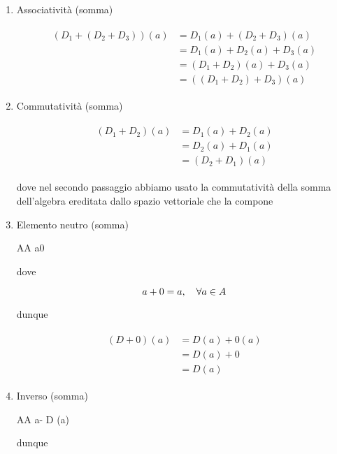 \begin{enumerate}
	\item Associatività (somma)
	
		\begin{align}
			\begin{split}
				( D_{1} + (D_{2} + D_{3}) ) (a) &= D_{1} (a) + (D_{2} + D_{3}) (a)\\
				&= D_{1} (a) + D_{2} (a) + D_{3} (a)\\
				&= (D_{1} + D_{2}) (a) + D_{3} (a)\\
				&= ( (D_{1} + D_{2}) + D_{3} ) (a)
			\end{split}
		\end{align}
	
	\item Commutatività (somma)
	
		\begin{align}
			\begin{split}
				(D_{1} + D_{2}) (a) &= D_{1} (a) + D_{2} (a)\\
				&= D_{2} (a) + D_{1} (a)\\
				&= (D_{2} + D_{1}) (a)
			\end{split}
		\end{align}
		
		dove nel secondo passaggio abbiamo usato la commutatività della somma dell'algebra ereditata dallo spazio vettoriale che la compone
	
	\item Elemento neutro (somma)
	
			{A}{A}
			{a}{0}
		
		dove
		
		\begin{equation}
			a + 0 = a \qcomma \forall a \in A
		\end{equation}
		
		dunque
		
		\begin{align}
			\begin{split}
				(D + 0) (a) &= D (a) + 0 (a)\\
				&= D (a) + 0\\
				&= D (a)
			\end{split}
		\end{align}
	
	\item Inverso (somma)
	
			{A}{A}
			{a}{- D (a)}
		
		dunque
		

\end{enumerate}
